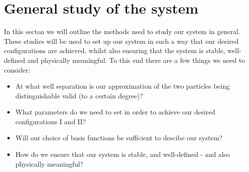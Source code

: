 \documentclass{subfiles}
\begin{document}
\section{General study of the system}
In this secton we will outline the methods used to study our system in general. These studies will be used to set up our system in such a way that our desired configurations are achieved, whilst also ensuring that the system is stable, well-defined and physically meaningful. To this end there are a few things we need to consider:
\begin{itemize}
    \item At what well separation is our approximation of the two particles being distinguishable valid (to a certain degree)?
    \item What parameters do we need to set in order to achieve our desired configurations I and II?
    \item Will our choice of basis functions be sufficient to descibe our system?
    \item How do we ensure that our system is stable, and well-defined - and also physically meaningful?
\end{itemize}
\end{document}
